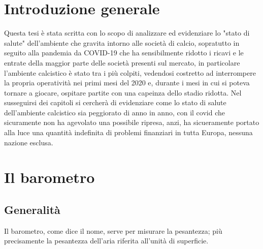 \documentclass[
    corpo=11.5pt,
    oneside,
    evenboxes,
    tipotesi=triennale,
    stile=classica,
    oldstyle,
    autoretitolo,
    greek,
]{toptesi}
\begin{document}

\begin{ThesisTitlePage}
    \struttura[]{}
\end{ThesisTitlePage}

\tablespagetrue\figurespagetrue
\indici

\mainmatter

\chapter{Introduzione generale}
Questa tesi è stata scritta con lo scopo di analizzare ed evidenziare lo "stato di salute"
dell'ambiente che gravita intorno alle societ\`a di calcio, sopratutto in seguito alla 
pandemia da COVID-19 che ha sensibilmente ridotto i ricavi e le entrate della maggior parte 
delle societ\`a presenti sul mercato, in particolare l'ambiente calcistico è stato tra i 
pi\`u colpiti, vedendosi costretto ad interrompere la propria operativit\`a nei primi mesi del 2020
e, durante i mesi in cui si poteva tornare a giocare, ospitare partite con una capeinza dello stadio ridotta.
Nel susseguirsi dei capitoli si cercher\`a di evidenziare come lo stato di salute dell'ambiente 
calcistico sia peggiorato di anno in anno, con il covid che sicuramente non ha agevolato una possibile 
ripresa, anzi, ha sicueramente portato alla luce una quantità indefinita di problemi finanziari in tutta Europa, nessuna nazione esclusa.



\chapter{Il barometro}
\section{Generalit\`a}
\begin{interlinea}{0.87} Il barometro, come dice il nome, serve per
misurare la pesantezza; pi\`u precisamente la pesantezza dell'aria
riferita all'unit\`a di superficie.
\end{interlinea}
\end{document}
